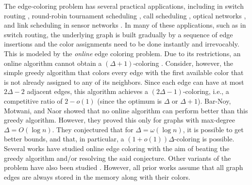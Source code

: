 \documentclass[10pt]{article}
\theoremstyle{definition}\newtheorem{definition}[lemma]{Definition}
\theoremstyle{remark}  \newtheorem*{remark}{Remark}
\begin{document}
The edge-coloring problem has several practical 
applications, including in switch routing 
\cite{aggarwal2003switch}, round-robin tournament 
scheduling \cite{JanuarioURD16}, call scheduling 
\cite{ErlebachJ01}, optical networks \cite{RaghavanU94}, 
and link scheduling in sensor networks 
\cite{GandhamDP05}. In many of these applications, such 
as in switch routing, the underlying graph is built 
gradually by a sequence of edge insertions and the color 
assignments need to be done instantly and irrevocably. 
This is modeled by the \emph{online} edge coloring 
problem. Due to its restrictions, an online algorithm 
cannot obtain a $(\Delta+1)$-coloring \cite{BarNoyMN92}. 
Consider, however, the simple greedy algorithm that 
colors every edge with the first available color that is 
not already assigned to any of its neighbors. Since each 
edge can have at most $2\Delta-2$ adjacent edges, this 
algorithm achieves a $(2\Delta-1)$-coloring, i.e., a 
competitive ratio of $2-o(1)$ (since the optimum is 
$\Delta$ or $\Delta+1$). Bar-Noy, Motwani, and Naor 
\cite{BarNoyMN92} showed that no online algorithm can 
perform better than this greedy algorithm. However, they 
proved this only for graphs with max-degree 
$\Delta=O(\log n)$. They conjectured that for 
$\Delta=\omega(\log n)$, it is possible to get better 
bounds, and that, in particular, a $(1+o(1))\Delta$-coloring
is possible. Several works \cite{aggarwal2003switch, BahmaniMM12, CohenPW19, BhattacharyaGW21, SaberiW21, KulkarniLSST22, NaorSW23} have studied online edge 
coloring with the aim of beating the greedy algorithm and/or resolving the said conjecture. Other variants of the problem have also been studied \cite{FavrholdtN03, Mikkelsen16, FavrholdtM18}. However, all prior works assume that all graph edges are always stored in the memory along with their colors.
\end{document}
